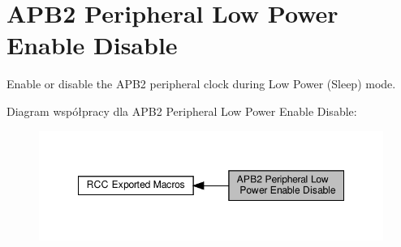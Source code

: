\hypertarget{group___r_c_c___a_p_b2___low_power___enable___disable}{}\section{A\+P\+B2 Peripheral Low Power Enable Disable}
\label{group___r_c_c___a_p_b2___low_power___enable___disable}


Enable or disable the A\+P\+B2 peripheral clock during Low Power (Sleep) mode.  


Diagram współpracy dla A\+P\+B2 Peripheral Low Power Enable Disable\+:\nopagebreak
\begin{figure}[H]
\begin{center}
\leavevmode
\includegraphics[width=348pt]{group___r_c_c___a_p_b2___low_power___enable___disable}
\end{center}
\end{figure}
